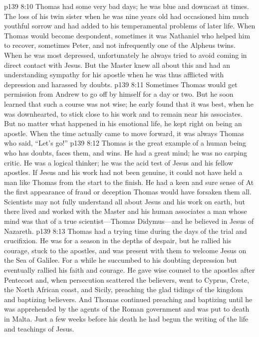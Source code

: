 \pc \vs p139 8:10 Thomas had some very bad days; he was blue and downcast at times. The loss of his twin sister when he was nine years old had occasioned him much youthful sorrow and had added to his temperamental problems of later life. When Thomas would become despondent, sometimes it was Nathaniel who helped him to recover, sometimes Peter, and not infrequently one of the Alpheus twins. When he was most depressed, unfortunately he always tried to avoid coming in direct contact with Jesus. But the Master knew all about this and had an understanding sympathy for his apostle when he was thus afflicted with depression and harassed by doubts.
\vs p139 8:11 Sometimes Thomas would get permission from Andrew to go off by himself for a day or two. But he soon learned that such a course was not wise; he early found that it was best, when he was downhearted, to stick close to his work and to remain near his associates. But no matter what happened in his emotional life, he kept right on being an apostle. When the time actually came to move forward, it was always Thomas who said, “Let’s go!”
\vs p139 8:12 Thomas is the great example of a human being who has doubts, faces them, and wins. He had a great mind; he was no carping critic. He was a logical thinker; he was the acid test of Jesus and his fellow apostles. If Jesus and his work had not been genuine, it could not have held a man like Thomas from the start to the finish. He had a keen and sure sense of  At the first appearance of fraud or deception Thomas would have forsaken them all. Scientists may not fully understand all about Jesus and his work on earth, but there lived and worked with the Master and his human associates a man whose mind was that of a true scientist---Thomas Didymus---and he believed in Jesus of Nazareth.
\pc \vs p139 8:13 Thomas had a trying time during the days of the trial and crucifixion. He was for a season in the depths of despair, but he rallied his courage, stuck to the apostles, and was present with them to welcome Jesus on the Sea of Galilee. For a while he succumbed to his doubting depression but eventually rallied his faith and courage. He gave wise counsel to the apostles after Pentecost and, when persecution scattered the believers, went to Cyprus, Crete, the North African coast, and Sicily, preaching the glad tidings of the kingdom and baptizing believers. And Thomas continued preaching and baptizing until he was apprehended by the agents of the Roman government and was put to death in Malta. Just a few weeks before his death he had begun the writing of the life and teachings of Jesus.\plusone
